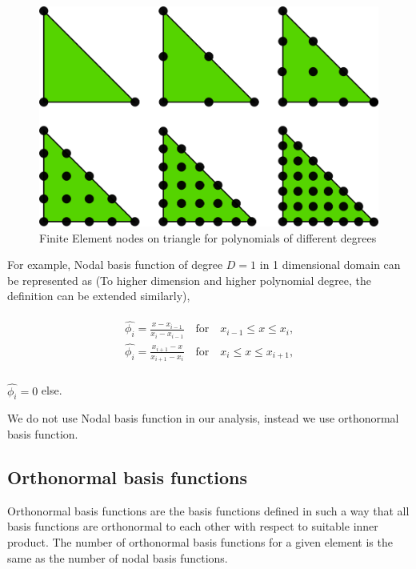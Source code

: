 \documentclass[a4paper,twoside,openright]{book}
\begin{document}
\begin{figure}
  \includegraphics[width=\linewidth]{fem_triangle_2.png}
  \caption{Finite Element nodes on triangle for polynomials of different degrees}
  \label{fig:Nodes on Triangular Element}
\end{figure}

For example, Nodal basis function of degree $D=1$ in 1 dimensional domain can be represented as (To higher dimension and higher polynomial degree, the definition can be extended similarly),

\begin{equation}
\begin{aligned}
\begin{split}
\hat{\phi_i} = \frac{x-x_{i-1}}{x_i-x_{i-1}} \quad \textrm{for} \quad x_{i-1} \leq x \leq x_i \textrm{,}\\
\hat{\phi_i} = \frac{x_{i+1}-x}{x_{i+1}-x_{i}} \quad \textrm{for} \quad x_{i} \leq x \leq x_{i+1} \textrm{,}\\
\end{split}
\end{aligned}
\end{equation}
\begin{center}
$\hat{\phi_i} = 0$ else.
\end{center}

We do not use Nodal basis function in our analysis, instead we use orthonormal basis function.

\subsection{Orthonormal basis functions}

Orthonormal basis functions are the basis functions defined in such a way that all basis functions are orthonormal to each other with respect to suitable inner product. The number of orthonormal basis functions for a given element is the same as the number of nodal basis functions. 
\end{document}
